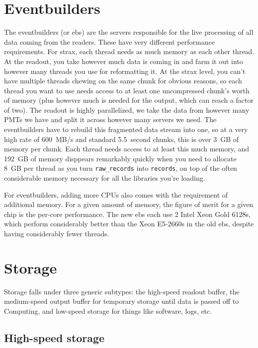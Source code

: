 \section{Eventbuilders}

The eventbuilders (or ebs) are the servers responsible for the live processing of all data coming from the readers.
These have very different performance requirements.
For strax, each thread needs as much memory as each other thread.
At the readout, you take however much data is coming in and farm it out into however many threads you use for reformatting it.
At the strax level, you can't have multiple threads chewing on the same chunk for obvious reasons, so each thread you want to use needs access to at least one uncompressed chunk's worth of memory (plus however much is needed for the output, which can reach a factor of two).
The readout is highly parallelized, we take the data from however many PMTs we have and split it across however many servers we need.
The eventbuilders have to rebuild this fragmented data stream into one, so at a very high rate of 600~MB/s and standard 5.5~second chunks, this is over 3~GB of memory per chunk.
Each thread needs access to at least this much memory, and 192~GB of memory disppears remarkably quickly when you need to allocate 8~GB per thread as you turn \texttt{raw\_records} into \texttt{records}, on top of the often considerable memory necessary for all the libraries you're loading.

For eventbuilders, adding more CPUs also comes with the requirement of additional memory.
For a given amount of memory, the figure of merit for a given chip is the per-core performance.
The new ebs each use 2 Intel Xeon Gold 6128s, which perform considerably better than the Xeon E5-2660s in the old ebs, despite having considerably fewer threads.

\section{Storage}

Storage falls under three generic subtypes: the high-speed readout buffer, the medium-speed output buffer for temporary storage until data is passed off to Computing, and low-speed storage for things like software, logs, etc.

\subsection{High-speed storage}


